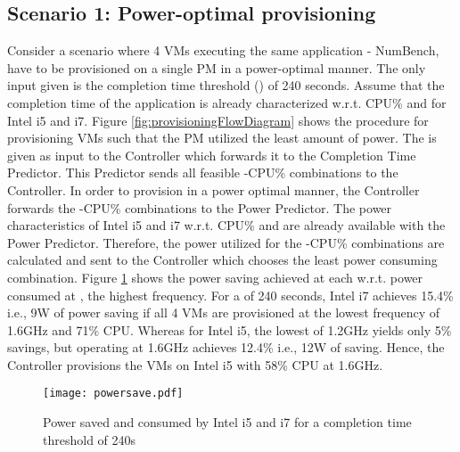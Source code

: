 \documentclass{sig-alternate}
\begin{document}
\subsection{Scenario 1: Power-optimal provisioning}
Consider a scenario where 4 VMs executing the same application - NumBench, have to be provisioned on a single PM in a power-optimal manner. The only input given is the completion time threshold () of 240 seconds. Assume that the completion time of the application is already characterized w.r.t. CPU\% and  for Intel i5 and i7. Figure \ref{fig:provisioningFlowDiagram} shows the procedure for provisioning VMs such that the PM utilized the least amount of power. The  is given as input to the Controller which forwards it to the Completion Time Predictor. This Predictor sends all feasible -CPU\% combinations to the Controller. In order to provision in a power optimal manner, the Controller forwards the -CPU\% combinations to the Power Predictor. The power characteristics of Intel i5 and i7 w.r.t. CPU\% and  are already available with the Power Predictor. Therefore, the power utilized for the -CPU\% combinations are calculated and sent to the Controller which chooses the least power consuming combination. Figure \ref{fig:powersave} shows the power saving achieved at each  w.r.t. power consumed at , the highest frequency. For a  of 240 seconds, Intel i7 achieves 15.4\% i.e., 9W of power saving if all 4 VMs are provisioned at the lowest frequency of 1.6GHz and 71\% CPU. Whereas for Intel i5, the lowest  of 1.2GHz yields only 5\% savings, but operating at 1.6GHz achieves 12.4\% i.e., 12W of saving. Hence, the Controller provisions the VMs on Intel i5 with 58\% CPU at 1.6GHz.

\begin{figure}[!htbp]
\centering
\vspace{-0.3cm}
\texttt{[image: powersave.pdf]}
\caption{Power saved and consumed by Intel i5 and i7 for a completion time threshold of 240s}
\label{fig:powersave}
 \vspace{-0.5cm}
\end{figure}
\end{document}
